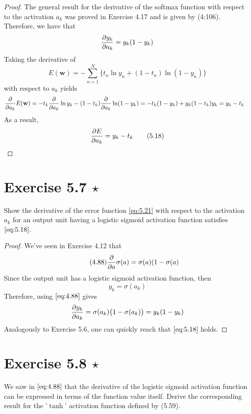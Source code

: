 \begin{proof}
    The general result for the derivative of the softmax function with respect to the 
    activation $a_k$ was proved in Exercise 4.17 and is given by (4:106).
    Therefore, we have that
    \[
        \pdv{y_k}{a_k} = y_k(1 - y_k)
    \] 
    Taking the derivative of 
    \begin{equation*}
        E(\mathbf{w}) = -\sum_{n=1}^{N} \{t_n \ln y_n + (1 - t_n) \ln(1 - y_n)\}
        \tag{5.21}\label{eq:5.21}
    \end{equation*}
    with respect to $a_k$ yields
    \begin{align*}
        \pdv{a_k} E(\mathbf{w}) &= -t_k \pdv{a_k} \ln y_k - (1 - t_k) \pdv{a_k} \ln(1 - y_k) 
        = -t_k(1 - y_k) + y_k(1 - t_k)y_k 
        = y_k - t_k
    \end{align*}
    As a result,
    \begin{equation*}
        \pdv{E}{a_k} = y_k - t_k
        \tag{5.18}\label{eq:5.18}
    \end{equation*}
\end{proof}

\section*{Exercise 5.7 $\star$}
Show the derivative of the error function \eqref{eq:5.21} with respect
to the activation $a_k$ for an output unit having a logistic sigmoid activation
function satisfies $\eqref{eq:5.18}$.

\vspace{1em}

\begin{proof}
    We've seen in Exercise 4.12 that
    \begin{equation*}\tag{4.88}
        \pdv{a} \sigma(a) = \sigma(a)(1 - \sigma(a)
    \end{equation*}
    Since the output unit has a logistic sigmoid activation function, then
    \[
        y_k = \sigma(a_k)
    \] 
    Therefore, using $\eqref{eq:4.88}$ gives
     \[
         \pdv{y_k}{a_k} = \sigma(a_k)\big(1 - \sigma(a_k)\big) = y_k(1 - y_k)
    \] 
    Analogously to Exercise 5.6, one can quickly reach that $\eqref{eq:5.18}$ holds.
\end{proof}

\section*{Exercise 5.8 $\star$}
We saw in $\eqref{eq:4.88}$ that the derivative of the logistic sigmoid
activation function can be expressed in terms of the function value itself.
Derive the corresponding result for the '$\tanh$' activation function defined
by (5.59).

